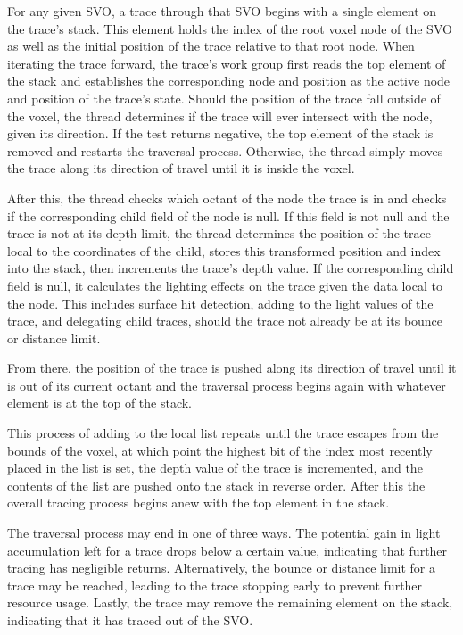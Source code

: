 \documentclass[onecolumn, draftclsnofoot,10pt, compsoc]{IEEEtran}
\begin{document}
For any given SVO, a trace through that SVO begins with a single element on the trace’s stack. This element holds the index of the root voxel node of the SVO as well as the initial position of the trace relative to that root node. When iterating the trace forward, the trace’s work group first reads the top element of the stack and establishes the corresponding node and position as the active node and position of the trace’s state. Should the position of the trace fall outside of the voxel, the thread determines if the trace will ever intersect with the node, given its direction. If the test returns negative, the top element of the stack is removed and restarts the traversal process. Otherwise, the thread simply moves the trace along its direction of travel until it is inside the voxel. 

After this, the thread checks which octant of the node the trace is in and checks if the corresponding child field of the node is null. If this field is not null and the trace is not at its depth limit, the thread determines the position of the trace local to the coordinates of the child, stores this transformed position and index into the stack, then increments the trace’s depth value. If the corresponding child field is null, it calculates the lighting effects on the trace given the data local to the node. This includes surface hit detection, adding to the light values of the trace, and delegating child traces, should the trace not already be at its bounce or distance limit.

From there, the position of the trace is pushed along its direction of travel until it is out of its current octant and the traversal process begins again with whatever element is at the top of the stack. 

This process of adding to the local list repeats until the trace escapes from the bounds of the voxel, at which point the highest bit of the index most recently placed in the list is set, the depth value of the trace is incremented, and the contents of the list are pushed onto the stack in reverse order. After this the overall tracing process begins anew with the top element in the stack.

The traversal process may end in one of three ways. The potential gain in light accumulation left for a trace drops below a certain value, indicating that further tracing has negligible returns. Alternatively, the bounce or distance limit for a trace may be reached, leading to the trace stopping early to prevent further resource usage. Lastly, the trace may remove the remaining element on the stack, indicating that it has traced out of the SVO. 
\end{document}
